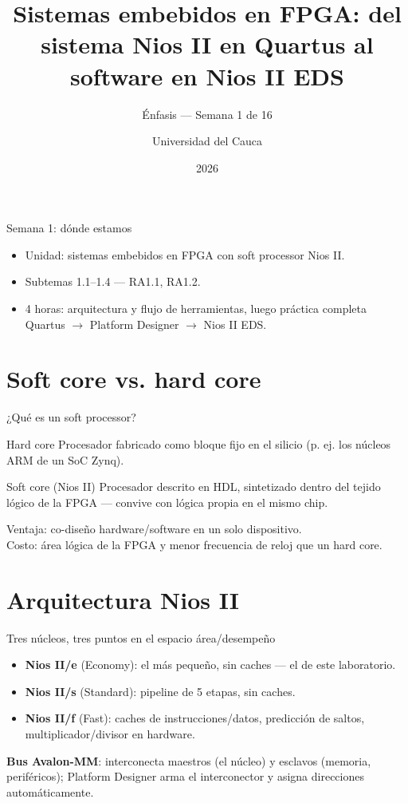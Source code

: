 \documentclass[11pt]{beamer}
\title[Semana 1: Nios II]{Sistemas embebidos en FPGA: del sistema Nios II en Quartus al software en Nios II EDS}
\subtitle{Énfasis --- Semana 1 de 16}
\author{Universidad del Cauca}
\date{2026}
\begin{document}
\begin{frame}
  \titlepage
\end{frame}

\begin{frame}{Semana 1: dónde estamos}
  \begin{itemize}
    \item Unidad: sistemas embebidos en FPGA con soft processor Nios II.
    \item Subtemas 1.1--1.4 --- RA1.1, RA1.2.
    \item 4 horas: arquitectura y flujo de herramientas, luego práctica completa
          Quartus $\to$ Platform Designer $\to$ Nios II EDS.
  \end{itemize}
  \tableofcontents
\end{frame}

\section{Soft core vs. hard core}

\begin{frame}{¿Qué es un soft processor?}
  \begin{block}{Hard core}
    Procesador fabricado como bloque fijo en el silicio (p. ej. los núcleos ARM de un SoC Zynq).
  \end{block}
  \begin{block}{Soft core (Nios II)}
    Procesador descrito en HDL, sintetizado dentro del tejido lógico de la FPGA --- convive con
    lógica propia en el mismo chip.
  \end{block}
  \vfill
  Ventaja: co-diseño hardware/software en un solo dispositivo.\\
  Costo: área lógica de la FPGA y menor frecuencia de reloj que un hard core.
\end{frame}

\section{Arquitectura Nios II}

\begin{frame}{Tres núcleos, tres puntos en el espacio área/desempeño}
  \begin{itemize}
    \item \textbf{Nios II/e} (Economy): el más pequeño, sin caches --- el de este laboratorio.
    \item \textbf{Nios II/s} (Standard): pipeline de 5 etapas, sin caches.
    \item \textbf{Nios II/f} (Fast): caches de instrucciones/datos, predicción de saltos,
          multiplicador/divisor en hardware.
  \end{itemize}
  \vfill
  \textbf{Bus Avalon-MM}: interconecta maestros (el núcleo) y esclavos (memoria, periféricos);
  Platform Designer arma el interconector y asigna direcciones automáticamente.
\end{frame}
\end{document}

